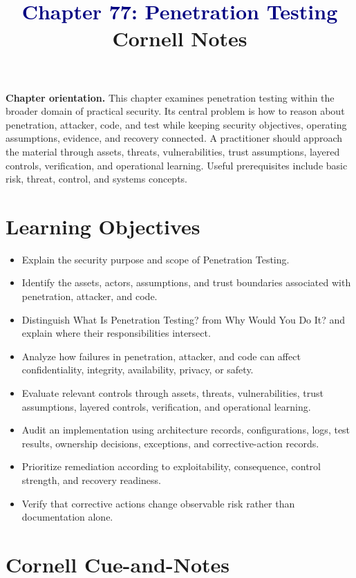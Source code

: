 \documentclass[11pt]{article}
\title{\textcolor{Navy}{Chapter 77: Penetration Testing}\\[2mm]\large Cornell Notes}
\author{}
\date{}
\begin{document}
\maketitle
\thispagestyle{fancy}
\vspace{-1.5em}
\begin{orientationbox}
\textbf{Chapter orientation.} This chapter examines penetration testing within the broader domain of practical security. Its central problem is how to reason about penetration, attacker, code, and test while keeping security objectives, operating assumptions, evidence, and recovery connected. A practitioner should approach the material through assets, threats, vulnerabilities, trust assumptions, layered controls, verification, and operational learning. Useful prerequisites include basic risk, threat, control, and systems concepts.
\end{orientationbox}
\section*{Learning Objectives}
\begin{itemize}
\item Explain the security purpose and scope of Penetration Testing.
\item Identify the assets, actors, assumptions, and trust boundaries associated with penetration, attacker, and code.
\item Distinguish What Is Penetration Testing? from Why Would You Do It? and explain where their responsibilities intersect.
\item Analyze how failures in penetration, attacker, and code can affect confidentiality, integrity, availability, privacy, or safety.
\item Evaluate relevant controls through assets, threats, vulnerabilities, trust assumptions, layered controls, verification, and operational learning.
\item Audit an implementation using architecture records, configurations, logs, test results, ownership decisions, exceptions, and corrective-action records.
\item Prioritize remediation according to exploitability, consequence, control strength, and recovery readiness.
\item Verify that corrective actions change observable risk rather than documentation alone.
\end{itemize}
\section*{Cornell Cue-and-Notes}
\end{document}
